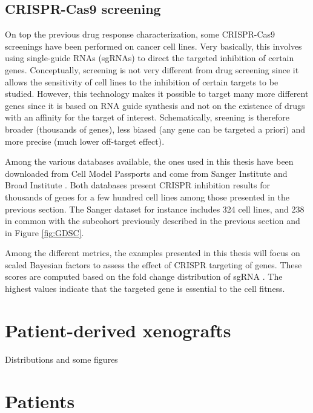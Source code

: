 \documentclass[a4paper,12pt,twoside,onecolumn,openright,final,oldfontcommands]{memoir}
\begin{document}
\subsection{CRISPR-Cas9 screening}\label{appendix-CRISPR}

On top the previous drug response characterization, some CRISPR-Cas9
screenings have been performed on cancer cell lines. Very basically,
this involves using single-guide RNAs (sgRNAs) to direct the targeted
inhibition of certain genes. Conceptually, screening is not very
different from drug screening since it allows the sensitivity of cell
lines to the inhibition of certain targets to be studied. However, this
technology makes it possible to target many more different genes since
it is based on RNA guide synthesis and not on the existence of drugs
with an affinity for the target of interest. Schematically, sreening is
therefore broader (thousands of genes), less biased (any gene can be
targeted a priori) and more precise (much lower off-target effect).

Among the various databases available, the ones used in this thesis have
been downloaded from Cell Model Passports and come from Sanger Institute
\citep{behan2019prioritization} and Broad Institute
\citep{meyers2017computational}. Both databases present CRISPR
inhibition results for thousands of genes for a few hundred cell lines
among those presented in the previous section. The Sanger dataset for
instance includes 324 cell lines, and 238 in common with the subcohort
previously described in the previous section and in Figure
\ref{fig:GDSC}.

Among the different metrics, the examples presented in this thesis will
focus on scaled Bayesian factors to assess the effect of CRISPR
targeting of genes. These scores are computed based on the fold change
distribution of sgRNA \citep{hart2016bagel}. The highest values indicate
that the targeted gene is essential to the cell fitness.

\section{Patient-derived xenografts}\label{patient-derived-xenografts}

Distributions and some figures

\section{Patients}\label{appendix-datasets-patients}
\end{document}
